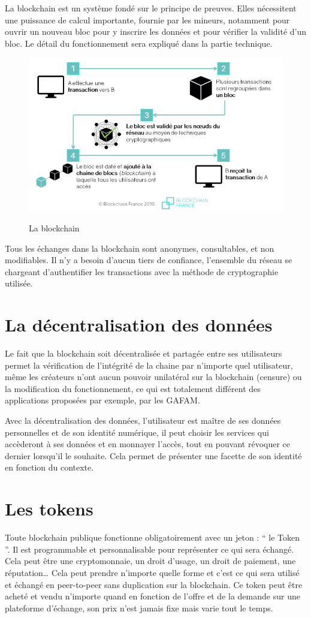 \documentclass[12pt, a4paper, oneside]{book}
\begin{document}
La blockchain est un système fondé sur le principe de preuves. Elles nécessitent une puissance de calcul importante, fournie par les mineurs, notamment pour ouvrir un nouveau bloc pour y inscrire les données et pour vérifier la validité d’un bloc. Le détail du fonctionnement sera expliqué dans la partie technique.

\begin{figure}[H]
    \begin{center}
      \includegraphics[width=.55\textwidth]{images/blockchain.png}
      \label{fig:blockchain}
      \caption{La blockchain}
    \end{center}
\end{figure}

Tous les échanges dans la blockchain sont anonymes, consultables, et non modifiables. Il n'y a besoin d'aucun tiers de confiance, l’ensemble du réseau se chargeant d’authentifier les transactions avec la méthode de cryptographie utilisée.

\section{La décentralisation des données}
    Le fait que la blockchain soit décentralisée et partagée entre ses utilisateurs permet la vérification de l’intégrité de la chaine par n’importe quel utilisateur, même les créateurs n’ont aucun pouvoir unilatéral sur la blockchain (censure) ou la modification du fonctionnement, ce qui est totalement différent des applications proposées par exemple, par les GAFAM.

Avec la décentralisation des données, l’utilisateur est maître de ses données personnelles et de son identité numérique, il peut choisir les services qui accèderont à ses données et en monnayer l’accès, tout en pouvant révoquer ce dernier lorsqu'il le souhaite. Cela permet de présenter une facette de son identité en fonction du contexte. 

\section{Les tokens}
Toute blockchain publique fonctionne obligatoirement avec un jeton : \hyphenquote{french}{ le Token }. Il est programmable et personnalisable pour représenter ce qui sera échangé. Cela peut être une cryptomonnaie, un droit d’usage, un droit de paiement, une réputation… Cela peut prendre n’importe quelle forme et c’est ce qui sera utilisé et échangé en peer-to-peer sans duplication sur la blockchain.
Ce token peut être acheté et vendu n’importe quand en fonction de l’offre et de la demande sur une plateforme d’échange, son prix n’est jamais fixe mais varie tout le temps. 
\end{document}

